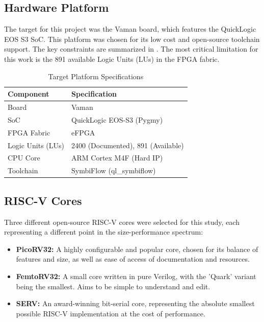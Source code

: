 \documentclass[conference]{IEEEtran}
\begin{document}
\subsection{Hardware Platform}
The target for this project was the Vaman board, which features the QuickLogic EOS S3 SoC. This platform was chosen for its low cost and open-source toolchain support. The key constraints are summarized in . The most critical limitation for this work is the 891 available Logic Units (LUs) in the FPGA fabric.

\begin{table}[H]
\centering
\caption{Target Platform Specifications}
\label{tab:platform_specs}
\renewcommand{\arraystretch}{1.2}
\begin{tabularx}{\columnwidth}{l X}
\toprule
\textbf{Component} & \textbf{Specification} \\
\midrule
Board & Vaman \\
SoC & QuickLogic EOS-S3 (Pygmy) \\
FPGA Fabric & eFPGA \\
Logic Units (LUs) & 2400 (Documented), 891 (Available) \\
CPU Core & ARM Cortex M4F (Hard IP) \\
Toolchain & SymbiFlow (ql\_symbiflow) \\
\bottomrule
\end{tabularx}
\end{table}

\subsection{RISC-V Cores}
Three different open-source RISC-V cores were selected for this study, each representing a different point in the size-performance spectrum:
\begin{itemize}
    \item \textbf{PicoRV32:} A highly configurable and popular core, chosen for its balance of features and size, as well as ease of access of documentation and resources.
    \item \textbf{FemtoRV32:} A small core written in pure Verilog, with the 'Quark' variant being the smallest. Aims to be simple to understand and edit.
    \item \textbf{SERV:} An award-winning bit-serial core, representing the absolute smallest possible RISC-V implementation at the cost of performance.
\end{itemize}
\end{document}
